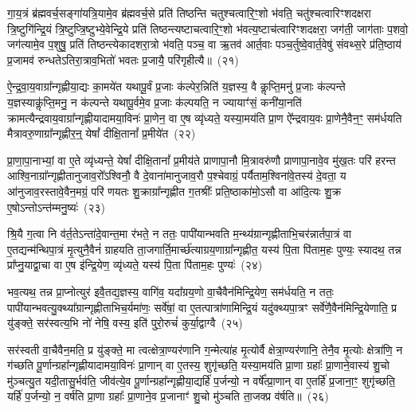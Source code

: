 गा॒य॒त्रं ब्र॑ह्मवर्च॒सङ्गा॑यत्रि॒यामे॒व ब्र॑ह्मवर्च॒से प्रति॑ तिष्ठन्ति चतुश्चत्वारि॒ꣳ॒शो भ॑वति॒ चतु॑श्चत्वारिꣳशद\-क्षरा त्रि॒ष्टुगि॑न्द्रि॒यं त्रि॒ष्टुप्त्रि॒ष्टुभ्ये॒वेन्द्रि॒ये प्रति॑ तिष्ठन्त्यष्टाचत्वारि॒ꣳ॒शो भ॑वत्य॒ष्टाच॑त्वारिꣳशद\-क्षरा॒ जग॑ती॒ जाग॑ताः प॒शवो॒ जग॑त्यामे॒व प॒शुषु॒ प्रति॑ तिष्ठन्त्येकादशरा॒त्रो भ॑वति॒ पञ्च॒ वा ऋ॒तव॑ आर्त॒वाः पञ्च॒र्तुष्वे॒वार्त॒वेषु॑ संवथ्स॒रे प्र॑ति॒ष्ठाय॑ प्र॒जामव॑ रुन्धते\-ऽतिरा॒त्राव॒भितो॑ भवतः प्र॒जायै॒ परि॑गृहीत्यै॥~(२१)\ip

{\anuvakamend[{तस्मा᳚द्\-गाय॒त्र्येका॒न्नप॑ञ्चा॒शच्च॑}]}

ऐ॒न्द्र॒वा॒य॒वाग्रा᳚न्गृह्णीया॒द्यः का॒मये॑त यथापू॒र्वं प्र॒जाः क॑ल्पेर॒न्निति॑ य॒ज्ञस्य॒ वै कॢप्ति॒मनु॑ प्र॒जाः क॑ल्पन्ते य॒ज्ञस्याकॢ॑प्ति॒मनु॒ न क॑ल्पन्ते यथापू॒र्वमे॒व प्र॒जाः क॑ल्पयति॒ न ज्यायाꣳ॑सं॒ कनी॑या॒नति॑ क्रामत्यैन्द्रवाय॒वाग्रा᳚न्गृह्णीयादामया॒विनः॑ प्रा॒णेन॒ वा ए॒ष व्यृ॑ध्यते॒ यस्या॒मय॑ति प्रा॒ण ऐ᳚न्द्रवाय॒वः प्रा॒णेनै॒वैन॒ꣳ॒ सम॑र्धयति मैत्रावरु॒णाग्रा᳚न्गृह्णीर॒न्॒ येषां᳚ दीक्षि॒तानां᳚ प्र॒मीये॑त~(२२)\ip

प्रा॒णा॒पा॒नाभ्यां॒ वा ए॒ते व्यृ॑ध्यन्ते॒ येषां᳚ दीक्षि॒तानां᳚ प्र॒मीय॑ते प्राणापा॒नौ मि॒त्रावरु॑णौ प्राणापा॒नावे॒व मु॑ख॒तः परि॑ हरन्त आश्वि॒नाग्रा᳚न्गृह्णीतानुजाव॒रो᳚\-ऽश्विनौ॒ वै दे॒वाना॑मानुजाव॒रौ प॒श्चेवाग्रं॒ पर्यैताम॒श्विना॑वे॒तस्य॑ दे॒वता॒ य आ॑नुजाव॒रस्तावे॒वैन॒मग्रं॒ परि॑ णयतः शु॒क्राग्रा᳚न्गृह्णीत ग॒तश्रीः᳚ प्रति॒ष्ठाका॑मो॒\-ऽसौ वा आ॑दि॒त्यः शु॒क्र ए॒षो\-ऽन्तो\-ऽन्त॑म्मनु॒ष्यः॑~(२३)\ip

श्रि॒यै ग॒त्वा नि व॑र्त॒ते\-ऽन्ता॑दे॒वान्त॒मा र॑भते॒ न ततः॒ पापी॑यान्भवति म॒न्थ्य॑ग्रान्गृह्णीताभि॒चर॑न्नार्तपा॒त्रं वा ए॒तद्यन्म॑न्थिपा॒त्रं मृ॒त्युनै॒वैनं॑ ग्राहयति ता॒जगार्ति॒मार्च्छ॑त्याग्रय॒णाग्रा᳚न्गृह्णीत॒ यस्य॑ पि॒ता पि॑ताम॒हः पुण्यः॒ स्यादथ॒ तन्न प्रा᳚प्नु॒याद्वा॒चा वा ए॒ष इ॑न्द्रि॒येण॒ व्यृ॑ध्यते॒ यस्य॑ पि॒ता पि॑ताम॒हः पुण्यः॑~(२४)\ip

भव॒त्यथ॒ तन्न प्रा॒प्नोत्युर॑ इवै॒तद्य॒ज्ञस्य॒ वागि॑व॒ यदा᳚ग्रय॒णो वा॒चैवैन॑मिन्द्रि॒येण॒ सम॑र्धयति॒ न ततः॒ पापी॑यान्भव\-त्यु॒क्थ्या᳚ग्रान्गृह्णीताभिच॒र्यमा॑णः॒ सर्वे॑षां॒ वा ए॒तत्पात्रा॑णामिन्द्रि॒यं यदु॑क्थ्यपा॒त्रꣳ सर्वे॑णै॒वैन॑मिन्द्रि॒येणाति॒ प्र यु॑ङ्क्ते॒ सर॑स्वत्य॒भि नो॑ नेषि॒ वस्य॒ इति॑ पुरो॒रुचं॑ कुर्या॒द्वाग्वै~(२५)\ip

सर॑स्वती वा॒चैवैन॒मति॒ प्र यु॑ङ्क्ते॒ मा त्वत्क्षेत्रा॒ण्यर॑णानि ग॒न्मेत्या॑ह मृ॒त्योर्वै क्षेत्रा॒ण्यर॑णानि॒ तेनै॒व मृ॒त्योः क्षेत्रा॑णि॒ न ग॑च्छति पू॒र्णान्ग्रहा᳚न्गृह्णीयादामया॒विनः॑ प्रा॒णान् वा ए॒तस्य॒ शुगृ॑च्छति॒ यस्या॒मय॑ति प्रा॒णा ग्रहाः᳚ प्रा॒णाने॒वास्य॑ शु॒चो मु॑ञ्चत्यु॒त यदी॒तासु॒र्भव॑ति॒ जीव॑त्ये॒व पू॒र्णान्ग्रहा᳚न्गृह्णीया॒द्यर्\mbox{}हि॑ प॒र्जन्यो॒ न वर्\mbox{}षे᳚त्प्रा॒णान् वा ए॒तर्\mbox{}हि॑ प्र॒जाना॒ꣳ॒ शुगृ॑च्छति॒ यर्\mbox{}हि॑ प॒र्जन्यो॒ न॒ वर्\mbox{}ष॑ति प्रा॒णा ग्रहाः᳚ प्रा॒णाने॒व प्र॒जानाꣳ॑ शु॒चो मु॑ञ्चति ता॒जक्प्र व॑र्\mbox{}षति॥~(२६)\ip

